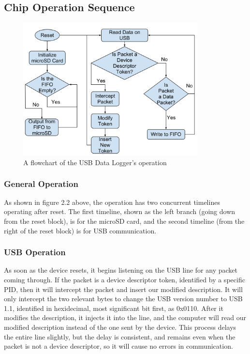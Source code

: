 \documentclass[12pt,letter,oneside]{report}
\begin{document}
\subsection{Chip Operation Sequence}
\begin{figure}[h]
	\caption{A flowchart of the USB Data Logger's operation}
	\begin{center}
		\includegraphics[width=0.85\textwidth]{OperationalTimeline}
	\end{center}
\end{figure}
\subsubsection{General Operation}
As shown in figure 2.2 above, the operation has two concurrent timelines operating after reset. The first timeline, shown as the left branch (going down from the reset block), is for the microSD card, and the second timeline (from the right of the reset block) is for USB communication.
\subsubsection{USB Operation}
As soon as the device resets, it begins listening on the USB line for any packet coming through. If the packet is a device descriptor token, identified by a specific PID, then it will intercept the packet and insert our modified description. It will only intercept the two relevant bytes to change the USB version number to USB 1.1, identified in hexidecimal, most significant bit first, as 0x0110. After it modifies the description, it injects it into the line, and the computer will read our modified description instead of the one sent by the device. This process delays the entire line slightly, but the delay is consistent, and remains even when the packet is not a device descriptor, so it will cause no errors in communication.
\end{document}
